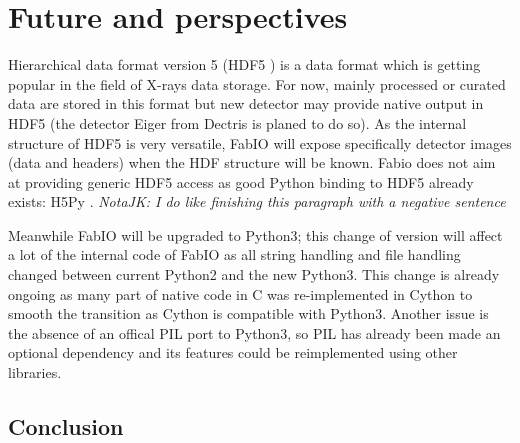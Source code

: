 \documentclass{iucr}
\begin{document}


\section{Future and perspectives}

Hierarchical data format version 5 (HDF5 \cite{hdf5}) is a data format which is
getting popular in the field of X-rays data storage. For now, mainly processed
or curated data are stored in this format but new detector may provide native
output in HDF5 (the detector Eiger from Dectris is planed to do so). As the
internal structure of HDF5 is very versatile, FabIO will expose specifically
detector images (data and headers) when the HDF structure will be known.
Fabio does not aim at providing generic HDF5 access as good
Python binding to HDF5 already exists: H5Py \cite{h5py}. 
{\em NotaJK: I do like finishing this paragraph with a negative sentence} 

Meanwhile FabIO will be upgraded to Python3; this change of version will affect
a lot of the internal code of FabIO as all string handling and file handling
changed between current Python2 and the new Python3. This change is already
ongoing as many part of native code in C was re-implemented in
Cython \cite{cython} to smooth the transition as Cython is compatible with
Python3. Another issue is the absence of an offical PIL port to Python3, so PIL
has already been made an optional dependency and its features could be
reimplemented using other libraries. 

\subsection{Conclusion}
\end{document}
